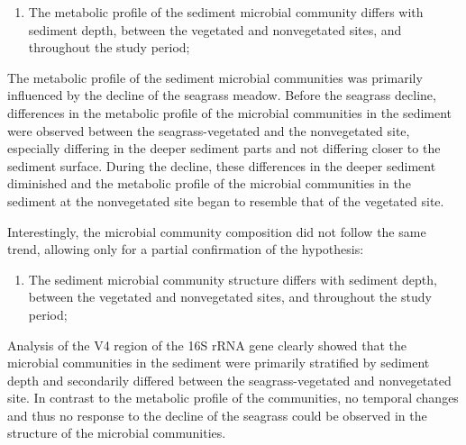 \documentclass[
  12 pt,
]{book}
\providecommand{\tightlist}{%
  \setlength{\itemsep}{0pt}\setlength{\parskip}{0pt}}
\begin{document}
\begin{enumerate}
\def\labelenumi{\arabic{enumi}.}
\setcounter{enumi}{1}
\tightlist
\item
  The metabolic profile of the sediment microbial community differs with sediment depth, between the vegetated and nonvegetated sites, and throughout the study period;
\end{enumerate}

The metabolic profile of the sediment microbial communities was primarily influenced by the decline of the seagrass meadow. Before the seagrass decline, differences in the metabolic profile of the microbial communities in the sediment were observed between the seagrass-vegetated and the nonvegetated site, especially differing in the deeper sediment parts and not differing closer to the sediment surface. During the decline, these differences in the deeper sediment diminished and the metabolic profile of the microbial communities in the sediment at the nonvegetated site began to resemble that of the vegetated site.

Interestingly, the microbial community composition did not follow the same trend, allowing only for a partial confirmation of the hypothesis:

\begin{enumerate}
\def\labelenumi{\arabic{enumi}.}
\setcounter{enumi}{2}
\tightlist
\item
  The sediment microbial community structure differs with sediment depth, between the vegetated and nonvegetated sites, and throughout the study period;
\end{enumerate}

Analysis of the V4 region of the 16S rRNA gene clearly showed that the microbial communities in the sediment were primarily stratified by sediment depth and secondarily differed between the seagrass-vegetated and nonvegetated site. In contrast to the metabolic profile of the communities, no temporal changes and thus no response to the decline of the seagrass could be observed in the structure of the microbial communities.

\bigskip
\end{document}
